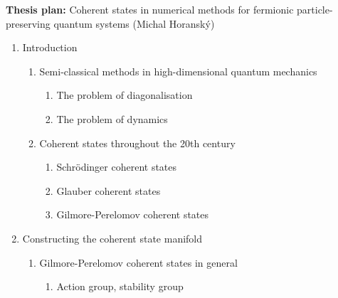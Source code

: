\documentclass[12pt]{article}
\begin{document}
\thispagestyle{empty}

	\begin{center}
	\textbf{Thesis plan:} Coherent states in numerical methods for fermionic particle-preserving quantum systems (Michal Horanský)
	\end{center}
	
	\begin{enumerate}
	
	\item Introduction
	
	\begin{enumerate}
	
		\item Semi-classical methods in high-dimensional quantum mechanics
		
		\begin{enumerate}
		
			\item The problem of diagonalisation
			
			\item The problem of dynamics
		
		\end{enumerate}
		
		\item Coherent states throughout the 20th century
		
		\begin{enumerate}
		
			\item Schr\"odinger coherent states
			
			\item Glauber coherent states
			
			\item Gilmore-Perelomov coherent states
		
		\end{enumerate}
	
	\end{enumerate}
	
	\item Constructing the coherent state manifold
	
	\begin{enumerate}
	
		\item Gilmore-Perelomov coherent states in general
		
		\begin{enumerate}
		
			\item Action group, stability group
	

\end{enumerate}
\end{enumerate}
\end{enumerate}
\end{document}
